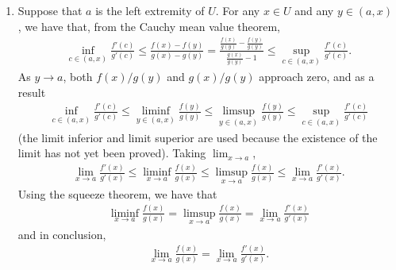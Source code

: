 \documentclass[a4paper,12pt]{article}
\begin{document}
\begin{enumerate}
\begin{enumerate}
                \item
                    Suppose that $a$ is the left extremity of $U$. For any $x \in U$ and any $y \in (a, x)$ , we have that, from the Cauchy mean value theorem,
                    \begin{align*}
                        \inf_{c \in (a, x)} \frac{f'(c)}{g'(c)} \leq \frac{f(x) - f(y)}{g(x) - g(y)} = \frac{\frac{f(x)}{g(y)} - \frac{f(y)}{g(y)}}{\frac{g(x)}{g(y)} - 1} \leq \sup_{c \in (a, x)} \frac{f'(c)}{g'(c)}.
                    \end{align*}
                    As $y \to a$, both $f(x) / g(y)$ and $g(x) / g(y)$ approach zero, and as a result
                    \begin{align*}
                        \inf_{c \in (a, x)} \frac{f'(c)}{g'(c)} \leq \liminf_{y \in (a, x)} \frac{f(y)}{g(y)} \leq \limsup_{y \in (a, x)} \frac{f(y)}{g(y)} \leq \sup_{c \in (a, x)} \frac{f'(c)}{g'(c)}
                    \end{align*}
                    (the limit inferior and limit superior are used because the existence of the limit has not yet been proved). Taking $\lim_{x \to a}$,
                    \begin{align*}
                        \lim_{x \to a} \frac{f'(x)}{g'(x)} \leq \liminf_{x \to a} \frac{f(x)}{g(x)} \leq \limsup_{x \to a} \frac{f(x)}{g(x)} \leq \lim_{x \to a} \frac{f'(x)}{g'(x)}.
                    \end{align*}
                    Using the squeeze theorem, we have that
                    \begin{align*}
                        \liminf_{x \to a} \frac{f(x)}{g(x)} = \limsup_{x \to a} \frac{f(x)}{g(x)} = \lim_{x \to a} \frac{f'(x)}{g'(x)}
                    \end{align*}
                    and in conclusion,
                    \begin{align*}
                        \lim_{x \to a} \frac{f(x)}{g(x)} = \lim_{x \to a} \frac{f'(x)}{g'(x)}.
                    \end{align*}


\end{enumerate}
\end{enumerate}
\end{document}
